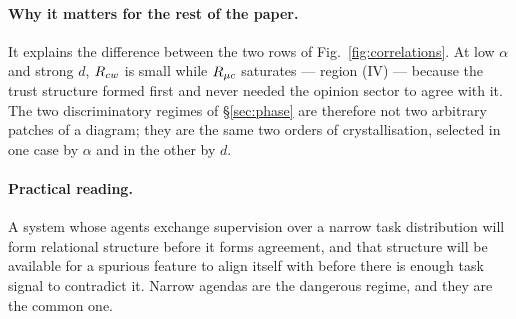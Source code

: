 \paragraph{Why it matters for the rest of the paper.} It explains the difference
between the two rows of Fig.~\ref{fig:correlations}. At low $\alpha$ and strong
$d$, $R_{cw}$ is small while $R_{\mu c}$ saturates --- region (IV) --- because the trust
structure formed first and never needed the opinion sector to agree with it. The
two discriminatory regimes of \S\ref{sec:phase} are therefore not two arbitrary
patches of a diagram; they are the same two orders of crystallisation, selected in
one case by $\alpha$ and in the other by $d$.

\paragraph{Practical reading.} A system whose agents exchange supervision over a
narrow task distribution will form relational structure before it forms agreement,
and that structure will be available for a spurious feature to align itself with
before there is enough task signal to contradict it. Narrow agendas are the
dangerous regime, and they are the common one.

